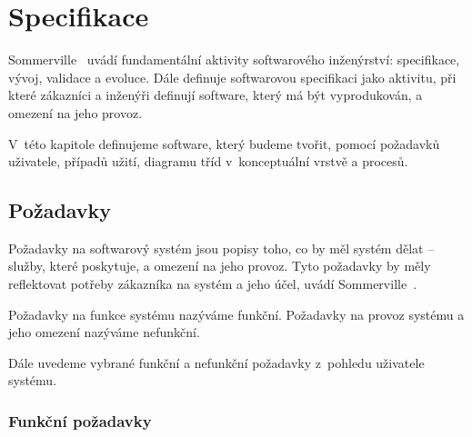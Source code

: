 \chapter{Specifikace}

Sommerville~\cite{sommerville_softwareengineering_2011} uvádí fundamentální aktivity softwarového inženýrství: specifikace, vývoj, validace a evoluce.
Dále definuje softwarovou specifikaci jako aktivitu, při které zákazníci a inženýři definují software, který má být vyprodukován, a omezení na jeho provoz.

V~této kapitole definujeme software, který budeme tvořit, pomocí požadavků uživatele, případů užití, diagramu tříd v~konceptuální vrstvě a procesů.

\section{Požadavky}

Požadavky na softwarový systém jsou popisy toho, co by měl systém dělat -- služby, které poskytuje, a omezení na jeho provoz.
Tyto požadavky by měly reflektovat potřeby zákazníka na systém a jeho účel, uvádí Sommerville~\cite[s.~83]{sommerville_softwareengineering_2011}.

Požadavky na funkce systému nazýváme funkční.
Požadavky na provoz systému a jeho omezení nazýváme nefunkční.

Dále uvedeme vybrané funkční a nefunkční požadavky z~pohledu uživatele systému.

\subsection{Funkční požadavky}

